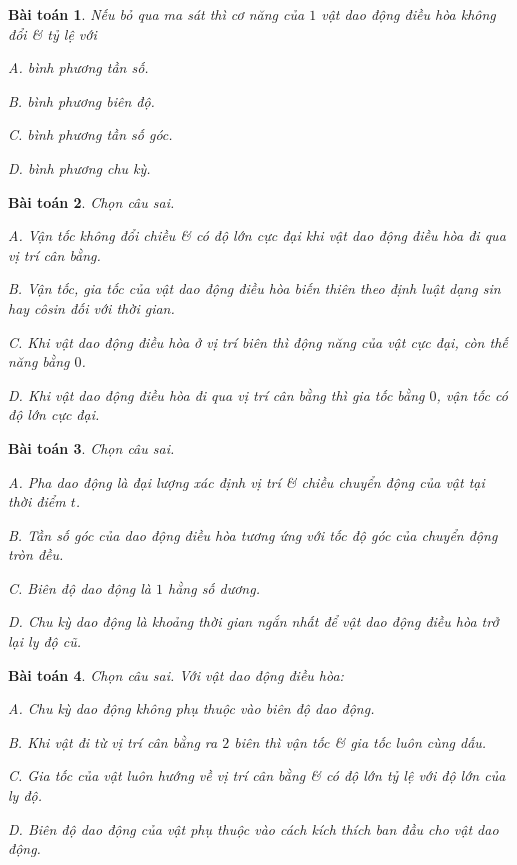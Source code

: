 \documentclass{article}
\numberwithin{equation}{section}
\newtheorem{baitoan}{Bài toán}[section]
\begin{document}
\begin{baitoan}
	Nếu bỏ qua ma sát thì cơ năng của $1$ vật dao động điều hòa không đổi \& tỷ lệ với
	\begin{enumerate*}
		\item[{\rm\sf A.}] bình phương tần số.
		\item[{\rm\sf B.}] bình phương biên độ.
		\item[{\rm\sf C.}] bình phương tần số góc.
		\item[{\rm\sf D.}] bình phương chu kỳ.
	\end{enumerate*}
\end{baitoan}

\begin{baitoan}
	Chọn câu sai.
	\begin{enumerate*}
		\item[{\rm\sf A.}] Vận tốc không đổi chiều \& có độ lớn cực đại khi vật dao động điều hòa đi qua vị trí cân bằng.
		\item[{\rm\sf B.}] Vận tốc, gia tốc của vật dao động điều hòa biến thiên theo định luật  dạng sin hay côsin đối với thời gian.
		\item[{\rm\sf C.}] Khi vật dao động điều hòa ở vị trí biên thì động năng của vật cực đại, còn thế năng bằng $0$.
		\item[{\rm\sf D.}] Khi vật dao động điều hòa đi qua vị trí cân bằng thì gia tốc bằng $0$, vận tốc có độ lớn cực đại.
	\end{enumerate*}
\end{baitoan}

\begin{baitoan}
	Chọn câu sai.
	\begin{enumerate*}
		\item[{\rm\sf A.}] Pha dao động là đại lượng xác định vị trí \& chiều chuyển động của vật tại thời điểm $t$.
		\item[{\rm\sf B.}] Tần số góc của dao động điều hòa tương ứng với tốc độ góc của chuyển động tròn đều.
		\item[{\rm\sf C.}] Biên độ dao động là $1$ hằng số dương.
		\item[{\rm\sf D.}] Chu kỳ dao động là khoảng thời gian ngắn nhất để vật dao động điều hòa trở lại ly độ cũ. 
	\end{enumerate*}
\end{baitoan}

\begin{baitoan}
	Chọn câu sai. Với vật dao động điều hòa:
	\begin{enumerate*}
		\item[{\rm\sf A.}] Chu kỳ dao động không phụ thuộc vào biên độ dao động.
		\item[{\rm\sf B.}] Khi vật đi từ vị trí cân bằng ra $2$ biên thì vận tốc \& gia tốc luôn cùng dấu.
		\item[{\rm\sf C.}] Gia tốc của vật luôn hướng về vị trí cân bằng \& có độ lớn tỷ lệ với độ lớn của ly độ.
		\item[{\rm\sf D.}] Biên độ dao động của vật phụ thuộc vào cách kích thích ban đầu cho vật dao động.
	\end{enumerate*}
\end{baitoan}
\end{document}
